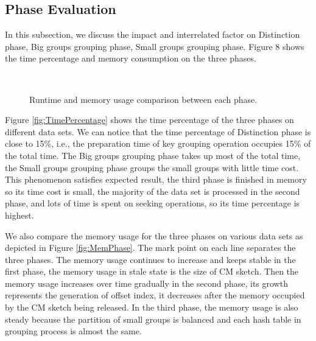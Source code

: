 \subsection{Phase Evaluation}
In this subsection, we discuss the impact and interrelated factor on Distinction phase, Big groups grouping phase, Small groups grouping phase. Figure 8 shows the time percentage and memory consumption on the three phases. 

\begin{figure}[htbp]	
	\label{fig: PhaseEvaluation}
    \hspace{0.23cm}
    \\    
	\caption{Runtime and memory usage comparison between each phase.}
		
\end{figure}

Figure \ref{fig:TimePercentage} shows the time percentage of the three phases on different data sets. We can notice that the time percentage of Distinction phase is close to 15\%, i.e., the preparation time of key grouping operation occupies 15\% of the total time. The Big groups grouping phase takes up most of the total time, the Small groups grouping phase groups the small groups with little time cost. This phenomenon satisfies expected result, the third phase is finished in memory so its time cost is small, the majority of the data set is processed in the second phase, and lots of time is spent on seeking operations, so its time percentage is highest.

We also compare the memory usage for the three phases on various data sets as depicted in Figure \ref{fig:MemPhase}. The mark point on each line separates the three phases. The memory usage continues to increase and keeps stable in the first phase, the memory usage in stale state is the size of CM sketch. Then the memory usage increases over time gradually in the second phase, its growth represents the generation of offset index, it decreases after the memory occupied by the CM sketch being released. In the third phase, the memory usage is also steady because the partition of small groups is balanced and each hash table in grouping process is almost the same.



